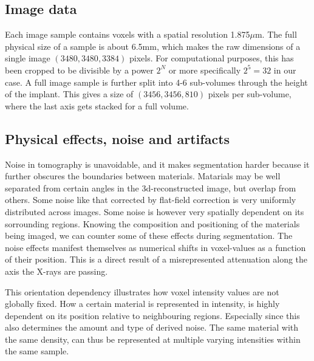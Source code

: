 \subsection{Image data}

Each image sample contains voxels with a spatial resolution 1.875$\mu$m. The full physical size of
a sample is about 6.5mm, which makes the raw dimensions of a single image $(3480,3480,3384)$ pixels.
For computational purposes, this has been cropped to be divisible by a power $2^N$ or more
specifically $2^5=32$ in our case. A full image sample is further split into 4-6 sub-volumes through
the height of the implant. This gives a size of $(3456,3456,810)$ pixels per sub-volume, where the
last axis gets stacked for a full volume. 

\subsection{Physical effects, noise and artifacts}
\label{sec:physics}

Noise in tomography is unavoidable, and it makes segmentation harder because it further obscures
the boundaries between materials. Matarials may be well separated from certain angles in the
3d-reconstructed image, but overlap from others. Some noise like that corrected by flat-field
correction is very uniformly distributed across images. Some noise is however very spatially
dependent on its sorrounding regions. Knowing the composition and positioning of the materials
being imaged, we can counter some of these effects during segmentation. The noise effects manifest
themselves as numerical shifts in voxel-values as a function of their position. This is a direct
result of a misrepresented attenuation along the axis the X-rays are passing.

This orientation dependency illustrates how voxel intensity values are not globally fixed. How a
certain material is represented in intensity, is highly dependent on its position relative to
neighbouring regions. Especially since this also determines the amount and type of derived noise. 
The same material with the same density, can thus be represented at multiple varying intensities
within the same sample.

